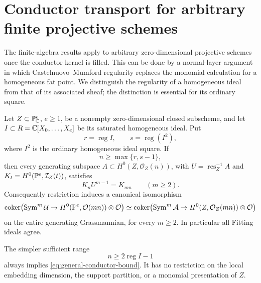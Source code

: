\section{Conductor transport for arbitrary finite projective schemes}
\label{sec:general-conductor}
The finite-algebra results apply to arbitrary zero-dimensional
projective schemes once the conductor kernel is filled. This can
be done by a normal-layer argument in which Castelnuovo--Mumford
regularity replaces the monomial calculation for a homogeneous fat
point. We distinguish the regularity of a homogeneous ideal from
that of its associated sheaf; the distinction is essential for its
ordinary square.

\begin{theorem}
\label{thm:regularity-conductor}
Let $Z\subset\mathbb P^e_\mathbb C$, $e\ge1$, be a nonempty zero-dimensional
closed subscheme, and let $I\subset R=\mathbb C[X_0,\ldots,X_e]$ be its
saturated homogeneous ideal. Put
\[
 r=\operatorname{reg} I,\qquad s=\operatorname{reg}(I^2),
\]
where $I^2$ is the ordinary homogeneous ideal square. If
\begin{equation}\label{eq:general-conductor-bound}
 n\ge\max\{r,s-1\},
\end{equation}
then every generating subspace $A\subset H^0(Z,\mathcal O_Z(n))$,
with $U=\operatorname{res}_Z^{-1}A$ and
$K_t=H^0(\mathbb P^e,\mathcal I_Z(t))$, satisfies
\begin{equation}\label{eq:general-kernel-fill}
 K_n U^{m-1}=K_{mn}\qquad(m\ge2).
\end{equation}
Consequently restriction induces a canonical isomorphism
\begin{equation}\label{eq:general-conductor-cokernel}
 \operatorname{coker}\bigl(\operatorname{Sym}^m\mathcal U\to
               H^0(\mathbb P^e,\mathcal O(mn))\otimes\mathcal O\bigr)
 \simeq
 \operatorname{coker}\bigl(\operatorname{Sym}^m\mathcal A\to
               H^0(Z,\mathcal O_Z(mn))\otimes\mathcal O\bigr)
\end{equation}
on the entire generating Grassmannian, for every $m\ge2$.
In particular all Fitting ideals agree.

The simpler sufficient range
\begin{equation}\label{eq:twice-regularity}
 n\ge2\operatorname{reg}I-1
\end{equation}
always implies \eqref{eq:general-conductor-bound}. It has no
restriction on the local embedding dimension, the support partition,
or a monomial presentation of $Z$.
\end{theorem}
